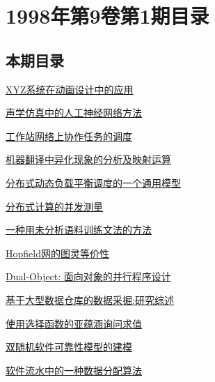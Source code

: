 \documentclass[a4paper]{article}
\begin{document}
\section{\textbf{1998年第9卷第1期目录}}
\subsection{本期目录}
\href{http://www.jos.org.cn/ch/reader/download_pdf.aspx?file_no=19980101&year_id=1998&quarter_id=1&falg=1}{XYZ系统在动画设计中的应用}

\href{http://www.jos.org.cn/ch/reader/download_pdf.aspx?file_no=19980102&year_id=1998&quarter_id=1&falg=1}{声学仿真中的人工神经网络方法}

\href{http://www.jos.org.cn/ch/reader/download_pdf.aspx?file_no=19980103&year_id=1998&quarter_id=1&falg=1}{工作站网络上协作任务的调度}

\href{http://www.jos.org.cn/ch/reader/download_pdf.aspx?file_no=19980104&year_id=1998&quarter_id=1&falg=1}{机器翻译中异化现象的分析及映射运算}

\href{http://www.jos.org.cn/ch/reader/download_pdf.aspx?file_no=19980105&year_id=1998&quarter_id=1&falg=1}{分布式动态负载平衡调度的一个通用模型}

\href{http://www.jos.org.cn/ch/reader/download_pdf.aspx?file_no=19980106&year_id=1998&quarter_id=1&falg=1}{分布式计算的并发测量}

\href{http://www.jos.org.cn/ch/reader/download_pdf.aspx?file_no=19980107&year_id=1998&quarter_id=1&falg=1}{一种用未分析语料训练文法的方法}

\href{http://www.jos.org.cn/ch/reader/download_pdf.aspx?file_no=19980108&year_id=1998&quarter_id=1&falg=1}{Hopfield网的图灵等价性}

\href{http://www.jos.org.cn/ch/reader/download_pdf.aspx?file_no=19980109&year_id=1998&quarter_id=1&falg=1}{Dual-Object: 面向对象的并行程序设计}

\href{http://www.jos.org.cn/ch/reader/download_pdf.aspx?file_no=19980110&year_id=1998&quarter_id=1&falg=1}{基于大型数据仓库的数据采掘:研究综述}

\href{http://www.jos.org.cn/ch/reader/download_pdf.aspx?file_no=19980111&year_id=1998&quarter_id=1&falg=1}{使用选择函数的亚蕴涵询问求值}

\href{http://www.jos.org.cn/ch/reader/download_pdf.aspx?file_no=19980112&year_id=1998&quarter_id=1&falg=1}{双随机软件可靠性模型的建模}

\href{http://www.jos.org.cn/ch/reader/download_pdf.aspx?file_no=19980113&year_id=1998&quarter_id=1&falg=1}{软件流水中的一种数据分配算法}
\end{document}
